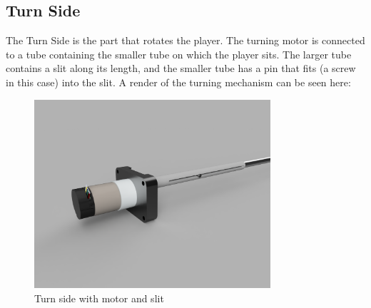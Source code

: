 \subsection{Turn Side}\label{subsec:turn-side}
The Turn Side is the part that rotates the player.
The turning motor is connected to a tube containing the smaller tube on which the player sits.
The larger tube contains a slit along its length, and the smaller tube has a pin that fits (a screw in this case) into the slit.
A render of the turning mechanism can be seen here:
\begin{figure}[H]
    \centering
    \includegraphics[height=7cm]{../photos/turn_side}
    \caption[turnside]{Turn side with motor and slit}
    \label{fig:turn_side2}
\end{figure}